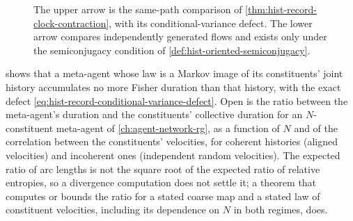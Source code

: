 \begin{figure}[htbp]
\centering
{}
\caption{The upper arrow is the same-path comparison of
\cref{thm:hist-record-clock-contraction}, with its conditional-variance defect.  The
lower arrow compares independently generated flows and exists only under the
semiconjugacy condition of \cref{def:hist-oriented-semiconjugacy}.}
\label{fig:hist-markov-clock-and-semiconjugacy}
\end{figure}

 shows that a meta-agent whose law is a Markov
image of its constituents' joint history accumulates no more Fisher duration than that
history, with the exact defect \eqref{eq:hist-record-conditional-variance-defect}.  Open
is the ratio between the meta-agent's duration and the constituents' collective duration
for an $N$-constituent meta-agent of \cref{ch:agent-network-rg}, as a function of $N$ and
of the correlation between the constituents' velocities, for coherent histories (aligned
velocities) and incoherent ones (independent random velocities).  The expected ratio of
arc lengths is not the square root of the expected ratio of relative entropies, so a
divergence computation does not settle it; a theorem that computes or bounds the ratio
for a stated coarse map and a stated law of constituent velocities, including its
dependence on $N$ in both regimes, does.

